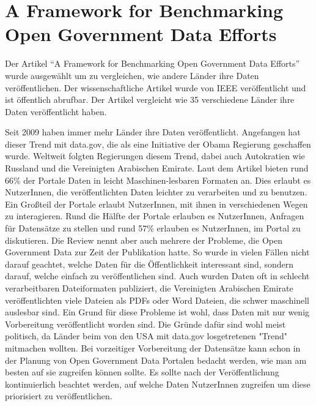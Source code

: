 \section{A Framework for Benchmarking Open Government Data Efforts}
Der Artikel ``A Framework for Benchmarking Open Government Data Efforts''\cite{open_gov} wurde ausgewählt um zu vergleichen, wie andere Länder ihre Daten veröffentlichen. Der wissenschaftliche Artikel wurde von IEEE veröffentlicht und ist öffentlich abrufbar. 
\smallskip
\noindent
Der Artikel vergleicht wie 35 verschiedene Länder ihre Daten veröffentlicht haben. 

\smallskip
Seit 2009 haben immer mehr Länder ihre Daten veröffentlicht. Angefangen hat dieser Trend mit data.gov, die als eine Initiative der Obama Regierung geschaffen wurde. Weltweit folgten Regierungen diesem Trend, dabei auch Autokratien wie Russland und die Vereinigten Arabischen Emirate.
Laut dem Artikel bieten rund 66\% der Portale Daten in leicht Maschinen-lesbaren Formaten an. Dies erlaubt es NutzerInnen, die veröffentlichten Daten leichter zu verarbeiten und zu benutzen. Ein Großteil der Portale erlaubt NutzerInnen, mit ihnen in verschiedenen Wegen zu interagieren. Rund die Hälfte der Portale erlauben es NutzerInnen, Anfragen für Datensätze zu stellen und rund 57\% erlauben es NutzerInnen, im Portal zu diskutieren. 
Die Review nennt aber auch mehrere der Probleme, die Open Government Data zur Zeit der Publikation hatte.
So wurde in vielen Fällen nicht darauf geachtet, welche Daten für die Öffentlichkeit interessant sind, sondern darauf, welche einfach zu veröffentlichen sind. Auch wurden Daten oft in schlecht verarbeitbaren Dateiformaten publiziert, die Vereinigten Arabischen Emirate veröffentlichten viele Dateien als PDFs oder Word Dateien, die schwer maschinell auslesbar sind. Ein Grund für diese Probleme ist wohl, dass Daten mit nur wenig Vorbereitung veröffentlicht worden sind. Die Gründe dafür sind wohl meist politisch, da Länder beim von den USA mit data.gov losgetretenen "Trend" mitmachen wollten. Bei vorzeitiger Vorbereitung der Datensätze kann schon in der Planung von Open Government Data Portalen bedacht werden, wie man am besten auf sie zugreifen können sollte. Es sollte nach der Veröffentlichung kontinuierlich beachtet werden, auf welche Daten NutzerInnen zugreifen um diese priorisiert zu veröffentlichen.